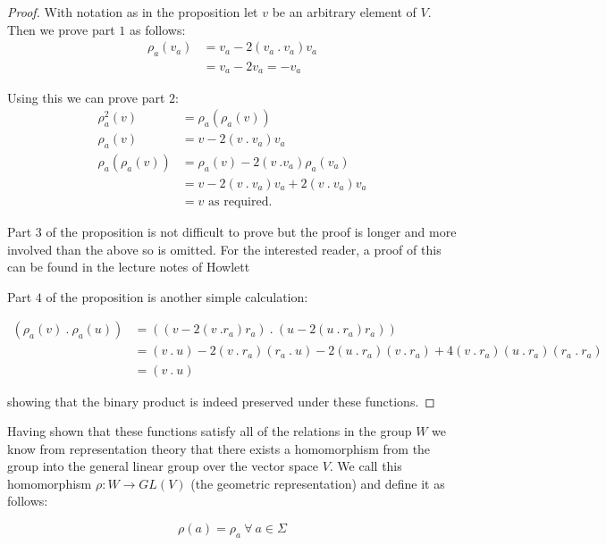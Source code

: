 \documentclass[a4paper,12pt]{article}
\begin{document}
\begin{proof}
	With notation as in the proposition let $v$ be an arbitrary element of $V$. Then we prove part $1$ as follows:
	\begin{align*}
		\rho_a(v_a) &= v_a - 2\left(v_a \: . \: v_a\right)v_a \\
		&= v_a - 2v_a = -v_a
	\end{align*}
	
	Using this we can prove part $2$:
	\begin{align*}
		\rho_a^2(v) &= \rho_a(\rho_a(v)) \\
		\rho_a(v) &= v - 2\left(v \: . \: v_a\right)v_a \\
		\rho_a(\rho_a(v)) &= \rho_a(v) - 2\left(v \: . v_a\right)\rho_a(v_a) \\
		&= v - 2\left(v \: . \: v_a\right)v_a + 2\left(v \: . \: v_a\right)v_a \\
		&= v \text{ as required.}
	\end{align*}
	
	Part $3$ of the proposition is not difficult to prove but the proof is longer and more involved than the above so is omitted. For the interested reader, a proof of this can be found in the lecture notes of Howlett \cite{howlettnotes}
	
	Part $4$ of the proposition is another simple calculation:
	
	\begin{align*}
		\left(\rho_a(v) \: . \: \rho_a(u)\right) &= ((v - 2(v \: . r_a)r_a) \: . \: (u - 2(u \: . \: r_a)r_a)) \\
		&= (v \: . \: u) - 2(v \: . \: r_a)(r_a \: . \: u) - 2(u \: . \: r_a)(v \: . \: r_a) + 4(v \: . \: r_a)(u \: . \: r_a)(r_a \: . \: r_a) \\
		&= (v \: . \: u)
	\end{align*}
	
	showing that the binary product is indeed preserved under these functions.
\end{proof}

Having shown that these functions satisfy all of the relations in the group $W$ we know from representation theory that there exists a homomorphism from the group into the general linear group over the vector space $V$. We call this homomorphism $\rho: W \rightarrow GL(V)$ (the geometric representation) and define it as follows:

\begin{equation*}
	\rho(a) = \rho_a \ \forall \ a \in \Sigma
\end{equation*}
\end{document}
